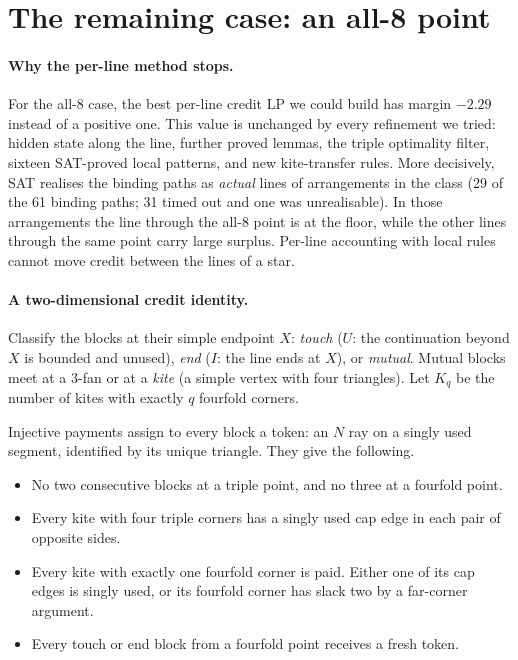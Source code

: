\documentclass[11pt]{article}
\theoremstyle{definition}
\theoremstyle{remark}
\begin{document}
\section{The remaining case: an all-8 point}\label{sec:open}

\paragraph{Why the per-line method stops.} For the all-8 case, the best per-line credit LP we could build has margin
$-2.29$ instead of a positive one. This value is unchanged by every refinement we tried: hidden state along the line,
further proved lemmas, the triple optimality filter, sixteen SAT-proved local patterns, and new kite-transfer rules.
More decisively, SAT realises the binding paths as \emph{actual} lines of arrangements in the class (29 of the 61 binding paths; 31 timed out
and one was unrealisable). In those arrangements the line through the all-8 point is at the floor,
while the other lines through the same point carry large surplus. Per-line accounting with local rules cannot move
credit between the lines of a star.

\paragraph{A two-dimensional credit identity.} Classify the blocks at their simple endpoint $X$: \emph{touch} ($U$: the
continuation beyond $X$ is bounded and unused), \emph{end} ($I$: the line ends at $X$), or \emph{mutual}. Mutual blocks
meet at a $3$-fan or at a \emph{kite} (a simple vertex with four triangles). Let $K_q$ be the number of kites with
exactly $q$ fourfold corners.

Injective payments assign to every block a token: an $N$ ray on a singly used segment, identified by its unique
triangle. They give the following.
\begin{itemize}[nosep]
\item No two consecutive blocks at a triple point, and no three at a fourfold point.
\item Every kite with four triple corners has a singly used cap edge in each pair of opposite sides.
\item Every kite with exactly one fourfold corner is paid. Either one of its cap edges is singly used, or its fourfold
corner has slack two by a far-corner argument.
\item Every touch or end block from a fourfold point receives a fresh token.
\end{itemize}
\end{document}
